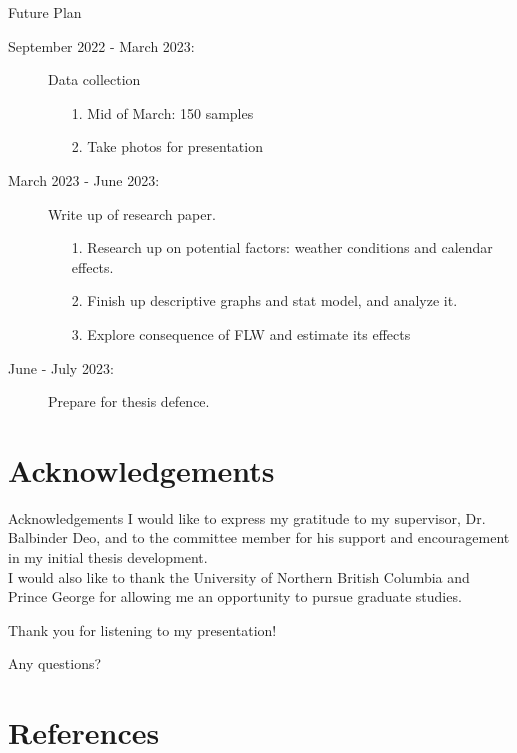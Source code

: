 \documentclass{beamer}
\renewcommand*{\bibfont}{\tiny}
\begin{document}
\begin{frame}{Future Plan}
    \begin{description}
        \item [September 2022 - March 2023:] Data collection
        \begin{enumerate}
            \item[1.] Mid of March: 150 samples
            \item[2.] Take photos for presentation
        \end{enumerate}
        \item [March 2023 - June 2023:] Write up of research paper.
        \begin{enumerate}
            \item[1.] Research up on potential factors: weather conditions and calendar effects.
            \item[2.] Finish up descriptive graphs and stat model, and analyze it.
            \item[3.] Explore consequence of FLW and estimate its effects
        \end{enumerate}
        \item [June - July 2023:] Prepare for thesis defence.
    \end{description}
\end{frame}

\section{Acknowledgements}
\begin{frame}{Acknowledgements}
I would like to express my gratitude to my supervisor, Dr. Balbinder Deo, and to the committee member for his support and encouragement in my initial thesis development.\\ 
I would also like to thank the University of Northern British Columbia and Prince George for allowing me an opportunity to pursue graduate studies.
\end{frame}

\begin{frame}{}
Thank you for listening to my presentation!

Any questions?
\end{frame}

\section{References}
\begin{frame}[allowframebreaks]

    \bibfont
    \printbibliography
\end{frame}
\end{document}
